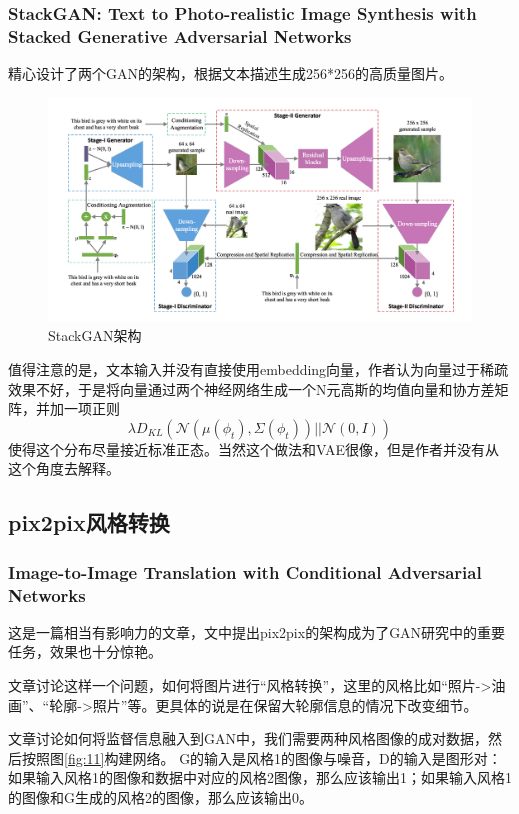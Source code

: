 \documentclass[a4paper]{article}
\begin{document}
\subsubsection{StackGAN: Text to Photo-realistic Image Synthesis with Stacked Generative Adversarial Networks\cite{DBLP:journals/corr/ZhangXLZHWM16}}
精心设计了两个GAN的架构，根据文本描述生成256*256的高质量图片。
\begin{figure}[H]
\centering
\includegraphics[width=\textwidth]{./img/16.png}
\caption{StackGAN架构}
\label{fig:16}
\end{figure}
值得注意的是，文本输入并没有直接使用embedding向量，作者认为向量过于稀疏效果不好，于是将向量通过两个神经网络生成一个N元高斯的均值向量和协方差矩阵，并加一项正则$$\lambda D_{KL}(\mathcal{N}(\mu(\phi_t),\Sigma(\phi_t))|| \mathcal{N} (0,I))$$使得这个分布尽量接近标准正态。当然这个做法和VAE很像，但是作者并没有从这个角度去解释。
\subsection{pix2pix风格转换}
\subsubsection{Image-to-Image Translation with Conditional Adversarial Networks\cite{DBLP:journals/corr/IsolaZZE16}}
这是一篇相当有影响力的文章，文中提出pix2pix的架构成为了GAN研究中的重要任务，效果也十分惊艳。

文章讨论这样一个问题，如何将图片进行“风格转换”，这里的风格比如“照片->油画”、“轮廓->照片”等。更具体的说是在保留大轮廓信息的情况下改变细节。

文章讨论如何将监督信息融入到GAN中，我们需要两种风格图像的成对数据，然后按照图\ref{fig:11}构建网络。
G的输入是风格1的图像与噪音，D的输入是图形对：如果输入风格1的图像和数据中对应的风格2图像，那么应该输出1；如果输入风格1的图像和G生成的风格2的图像，那么应该输出0。
\end{document}
